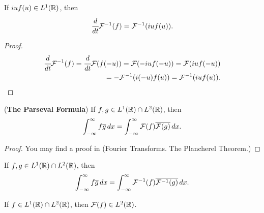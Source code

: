 \documentclass[main.tex]{subfiles}
\begin{document}
\begin{theorem}
\label{fourier_deriv}
If $iuf(u)\in L^1(\mathbb{R})$, then
\begin{equation}
    \cfrac{d}{dt}\mathcal{F}^{-1}(f) = \mathcal{F}^{-1}(iuf(u)).
\end{equation}
\end{theorem}
\begin{proof}

\begin{equation}
\begin{split}
 \cfrac{d}{dt}\mathcal{F}^{-1}(f) = \cfrac{d}{dt}\mathcal{F}(f(-u)) = \mathcal{F}(-iuf(-u)) = \mathcal{F}(iuf(-u)) \\
 = - \mathcal{F}^{-1}(i(-u)f(u)) = \mathcal{F}^{-1}(iuf(u)).
 \end{split}
\end{equation}

\end{proof}
\begin{theorem}\label{plancherel}(\textbf{The Parseval Formula}) If $f,g\in L^1(\mathbb{R})\cap L^2(\mathbb{R})$, then
\begin{equation}
    \int_{-\infty}^{\infty} f\overline{g}\,dx = \int_{-\infty}^{\infty} \mathcal{F}(f)\overline{\mathcal{F}(g)}\,dx.
\end{equation}
\end{theorem}
\begin{proof}
You may find a proof in \cite{rudin1987} (Fourier Transforms. The Plancherel Theorem.)
\end{proof}
\begin{corollary}
\label{plancherel_corollary}
If $f,g\in L^1(\mathbb{R})\cap L^2(\mathbb{R})$, then
\begin{equation}
    \int_{-\infty}^{\infty} f\overline{g}\,dx = \int_{-\infty}^{\infty} \mathcal{F}^{-1}(f)\overline{\mathcal{F}^{-1}(g)}\,dx.
\end{equation}
\end{corollary}

\begin{corollary}
If $f\in L^1(\mathbb{R})\cap L^2(\mathbb{R})$, then $\mathcal{F}(f)\in L^2(\mathbb{R})$.
\end{corollary}
\end{document}

